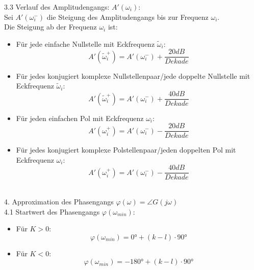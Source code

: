 \documentclass[10pt,a4paper]{article}
\begin{document}
3.3 Verlauf des Amplitudengangs: $A'(\omega_i)$: \\
Sei $A'(\omega_i^-)$ die Steigung des Amplitudengangs bis zur Frequenz $\omega_i$. \\
Die Steigung ab der Frequenz $\omega_i$ ist:
\begin{itemize}
	\item Für jede einfache Nullstelle mit Eckfrequenz $\tilde \omega_i$:
	$$
		A'(\tilde \omega_i^+) = A'(\omega_i^-) + \frac{20 dB}{Dekade}
	$$
	\item Für jedes konjugiert komplexe Nullstellenpaar/jede doppelte Nullstelle mit Eckfrequenz $\tilde \omega_i$:
	$$
		A'(\tilde \omega_i^+) = A'(\omega_i^-) + \frac{40 dB}{Dekade}
	$$
	\item Für jeden einfachen Pol mit Eckfrequenz $\omega_i$:
	$$
		A'(\omega_i^+) = A'(\omega_i^-) - \frac{20 dB}{Dekade}
	$$
	\item Für jedes konjugiert komplexe Polstellenpaar/jeden doppelten Pol mit Eckfrequenz $\omega_i$:
	$$
		A'(\omega_i^+) = A'(\omega_i^-) - \frac{40 dB}{Dekade}
	$$
\end{itemize} ~\\

4. Approximation des Phasengangs $\varphi(\omega) = \angle G(j \omega)$ \\
4.1 Startwert des Phasengangs $\varphi(\omega_{min})$: \\
\begin{itemize}
	\item Für $K > 0$:
	$$
		\varphi(\omega_{min}) = 0° + (k-l) ⋅ 90°
	$$
	\item Für $K < 0$:
	$$
		\varphi(\omega_{min}) = -180° + (k-l) ⋅ 90°
	$$
\end{itemize} ~\\
\end{document}
